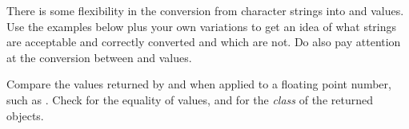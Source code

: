 \documentclass[krantz2]{krantz}\usepackage{knitr}%
\begin{document}
\begin{playground}
There is some flexibility in the conversion from character strings into  and  values. Use the examples below plus your own variations to get an idea of what strings are acceptable and correctly converted and which are not. Do also pay attention at the conversion between  and  values.

\begin{knitrout}\footnotesize
{}\color{fgcolor}\begin{kframe}
\begin{alltt}
\hlstd{(}\hlstd{)}
\hlstd{(}\hlstd{)}
\hlstd{(}\hlstd{)}
\hlstd{(}\hlstd{)}
\hlstd{(}\hlstd{)}
\hlstd{(}\hlstd{)}
\hlstd{(}\hlstd{)}
\hlstd{(}\hlstd{)}
\hlstd{(}\hlstd{)}
\hlstd{(}\hlstd{)}
\hlstd{(}\hlopt{-}\hlstd{)}
\end{alltt}
\end{kframe}
\end{knitrout}

\end{playground}

\begin{playground}
Compare the values returned by  and  when applied to a floating point number, such as . Check for the equality of values, and for the \emph{class} of the returned objects.
\end{playground}
\end{document}
